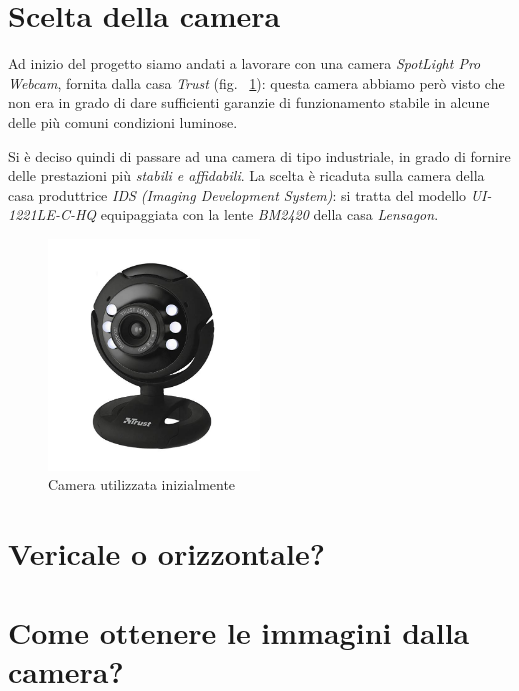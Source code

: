 \section{Scelta della camera}
Ad inizio del progetto siamo andati a lavorare con una camera \textit{SpotLight Pro Webcam}, fornita dalla casa \textit{Trust} (fig. ~\ref{fig:TrustCam}): questa camera abbiamo però visto che non era in grado di dare sufficienti garanzie di funzionamento stabile in alcune delle più comuni condizioni luminose.

Si è deciso quindi di passare ad una camera di tipo industriale, in grado di fornire delle prestazioni più \textit{stabili e affidabili}. 
La scelta è ricaduta sulla camera della casa produttrice \textit{IDS (Imaging Development System)}: si tratta del modello \textit{UI-1221LE-C-HQ} equipaggiata con la lente \textit{BM2420} della casa \textit{Lensagon}.


\begin{figure}
	\centering
	\includegraphics[width=0.5\textwidth]{Immagini/TrustCam.jpg}
	\caption{Camera utilizzata inizialmente}
	\label{fig:TrustCam}
\end{figure}


\section{Vericale o orizzontale?}
\section{Come ottenere le immagini dalla camera?}

